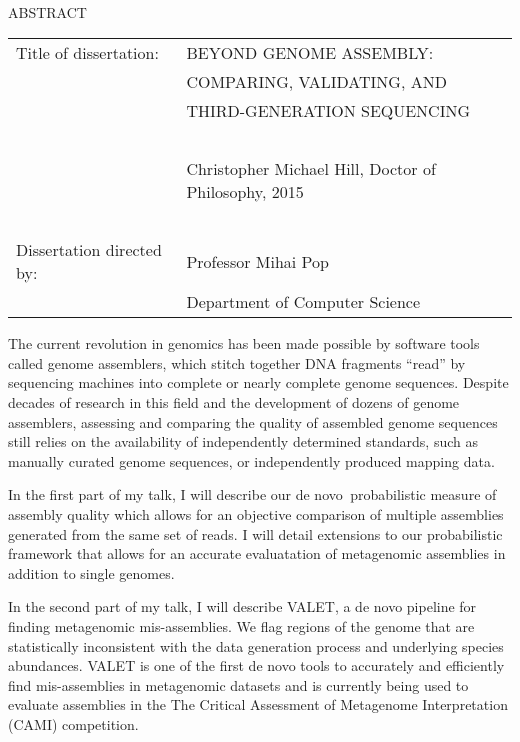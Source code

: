 
\hbox{\ }

\renewcommand{\baselinestretch}{1}
\small \normalsize

\begin{center}
\large{{ABSTRACT}}

\vspace{3em}

\end{center}
\hspace{-.15in}
\begin{tabular}{ll}
Title of dissertation:    & {\large  BEYOND GENOME ASSEMBLY: }\\
&				      {\large COMPARING, VALIDATING, AND } \\
&                     {\large THIRD-GENERATION SEQUENCING} \\
\ \\
&                          {\large  Christopher Michael Hill, Doctor of Philosophy, 2015} \\
\ \\
Dissertation directed by: & {\large  Professor Mihai Pop} \\
&  				{\large	 Department of Computer Science } \\
\end{tabular}

\vspace{3em}

\renewcommand{\baselinestretch}{2}
\large \normalsize

The current revolution in genomics has been made possible by software tools called genome assemblers, which stitch together DNA fragments ``read'' by sequencing machines into complete or nearly complete genome sequences. Despite decades of research in this field and the development of dozens of genome assemblers, assessing and comparing the quality of assembled genome sequences still relies on the availability of independently determined standards, such as manually curated genome sequences, or independently produced mapping data.

In the first part of my talk, I will describe our de novo  probabilistic measure of assembly quality which allows for an objective comparison of multiple assemblies generated from the same set of reads. I will detail extensions to our probabilistic framework that allows for an accurate evaluatation of metagenomic assemblies in addition to single genomes.

In the second part of my talk, I will describe VALET, a de novo pipeline for finding metagenomic mis-assemblies.  We flag regions of the genome that are statistically inconsistent with the data generation process and underlying species abundances. VALET is one of the first de novo tools to accurately and efficiently find mis-assemblies in metagenomic datasets and is currently being used to evaluate assemblies in the The Critical Assessment of Metagenome Interpretation (CAMI) competition.

